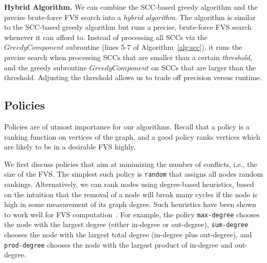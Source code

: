 {\bf Hybrid Algorithm.}
We can combine the SCC-based greedy algorithm and the precise brute-force FVS search into a \emph{hybrid algorithm}. The algorithm is similar to the SCC-based greedy algorithm but runs a precise, brute-force FVS search whenever it can afford to. Instead of processing all SCCs via the $GreedyComponent$ subroutine (lines 5-7 of Algorithm~\ref{alg:scc}), it runs the precise search when processing SCCs that are smaller than a certain \emph{threshold}, and the greedy subroutine $GreedyComponent$ on SCCs that are larger than the threshold. Adjusting the threshold allows us to trade off precision versus runtime.

\subsection{Policies}
\label{subsec:validator_reordering:policy}
Policies are of utmost importance for our algorithms. Recall that a policy is a ranking function on vertices of the graph, and a good policy ranks vertices which are likely to be in a desirable FVS highly. 

We first discuss policies that aim at minimizing the number of conflicts, i.e., the size of the FVS. The simplest such policy is \texttt{random} that assigns all nodes random rankings. Alternatively, we can rank nodes using degree-based heuristics, based on the intuition that the removal of a node will break many cycles if the node is high in some measurement of its graph degree. Such heuristics have  been shown to work well for FVS computation~\cite{cutello2015targeting}. For example, the policy \texttt{max-degree} chooses the node with the largest degree (either in-degree or out-degree), \texttt{sum-degree} chooses the node with the largest total degree (in-degree plus out-degree), and \texttt{prod-degree} chooses the node with the largest product of in-degree and out-degree. 

